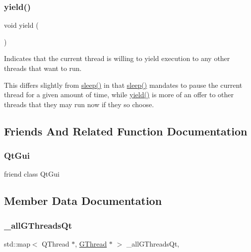 \subsubsection{\texorpdfstring{yield()}{yield()}}
{\footnotesize\ttfamily void yield (\begin{DoxyParamCaption}{ }\end{DoxyParamCaption})\hspace{0.3cm}{\ttfamily [pure virtual]}}



Indicates that the current thread is willing to yield execution to any other threads that want to run. 

This differs slightly from \mbox{\hyperlink{classGThread_aa766a832061596446daffb891f42b71d}{sleep()}} in that \mbox{\hyperlink{classGThread_aa766a832061596446daffb891f42b71d}{sleep()}} mandates to pause the current thread for a given amount of time, while \mbox{\hyperlink{classGThread_a77a5c1943920f355bd1db8cb99bddcfc}{yield()}} is more of an offer to other threads that they may run now if they so choose. 

\subsection{Friends And Related Function Documentation}
\mbox{\label{classGThread_a78e6068a40352424a09cd3753706c619}} 
\subsubsection{\texorpdfstring{Qt\+Gui}{QtGui}}
{\footnotesize\ttfamily friend class Qt\+Gui\hspace{0.3cm}{\ttfamily [friend]}}



\subsection{Member Data Documentation}
\mbox{\label{classGThread_a70101b45edebc3c3a381ba4e52aca4f7}} 
\subsubsection{\texorpdfstring{\+\_\+all\+G\+Threads\+Qt}{\_allGThreadsQt}}
{\footnotesize\ttfamily std\+::map$<$ Q\+Thread $\ast$, \mbox{\hyperlink{classGThread}{G\+Thread}} $\ast$ $>$ \+\_\+all\+G\+Threads\+Qt\hspace{0.3cm}{\ttfamily [static]}, {\ttfamily [protected]}}

